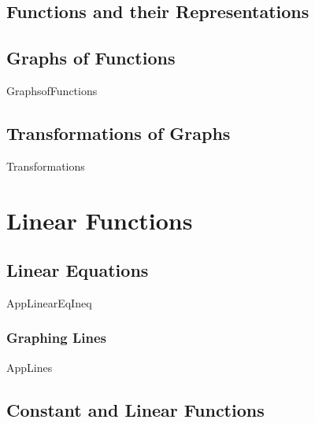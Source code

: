 \section{Functions and their Representations}



\newpage

\section{Graphs of Functions}

{GraphsofFunctions}

\newpage

\section{Transformations of Graphs}

{Transformations}

\newpage

\chapter{Linear Functions}

\section{Linear Equations}

{AppLinearEqIneq}
\newpage

\subsection{Graphing Lines}
{AppLines}

\newpage

\section{Constant and Linear Functions}



\newpage

